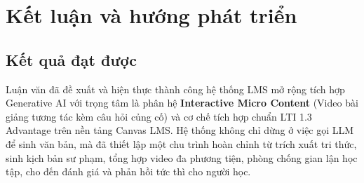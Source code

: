 \chapter{Kết luận và hướng phát triển}
\label{chap:ket-luan-huong-phat-trien}

\section{Kết quả đạt được}

Luận văn đã đề xuất và hiện thực thành công hệ thống LMS mở rộng tích hợp
Generative AI với trọng tâm là phân hệ \textbf{Interactive Micro Content}
(Video bài giảng tương tác kèm câu hỏi củng cố) và cơ chế tích hợp chuẩn
LTI 1.3 Advantage trên nền tảng Canvas LMS. Hệ thống không chỉ dừng ở việc
gọi LLM để sinh văn bản, mà đã thiết lập một chu trình hoàn chỉnh từ trích
xuất tri thức, sinh kịch bản sư phạm, tổng hợp video đa phương tiện, phòng
chống gian lận học tập, cho đến đánh giá và phản hồi tức thì cho người học.

